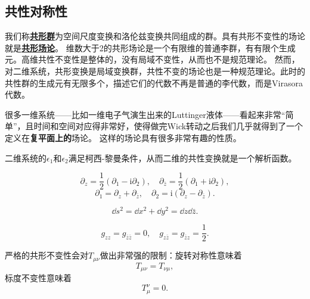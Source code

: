 \documentclass[hyperref, UTF8, a4paper]{ctexart}
\newcommand*{\ii}{\mathrm{i}}
\newcommand{\concept}[1]{\underline{\textbf{#1}}}
\renewcommand{\emph}{\textbf}
\begin{document}

\subsection{共性对称性}

我们称\concept{共形群}为空间尺度变换和洛伦兹变换共同组成的群。具有共形不变性的场论就是\concept{共形场论}。
维数大于2的共形场论是一个有限维的普通李群，有有限个生成元。高维共性不变性是整体的，没有局域不变性，从而也不是规范理论。
然而，对二维系统，共形变换是局域变换群，共性不变的场论也是一种规范理论。此时的共性群的生成元有无限多个，描述它们的代数不再是普通的李代数，而是Virasora代数。

很多一维系统——比如一维电子气演生出来的Luttinger液体——看起来非常“简单”，且时间和空间对应得非常好，使得做完Wick转动之后我们几乎就得到了一个定义在\emph{复平面上的}场论。
这样的场论具有很多非常有趣的性质。

二维系统的$\epsilon_1$和$\epsilon_2$满足柯西-黎曼条件，从而二维的共性变换就是一个解析函数。

\begin{equation}
    \partial_z = \frac{1}{2} (\partial_1 - \ii \partial_2), \quad \partial_{\bar{z}} = \frac{1}{2} (\partial_1 + \ii \partial_2),
\end{equation}
\begin{equation}
    \partial_1 = \partial_z + \partial_{\bar{z}}, \quad \partial_2 = \ii (\partial_z - \partial_{\bar{z}}).
\end{equation}

\begin{equation}
    \dd{s^2} = \dd{x^2} + \dd{y^2} = \dd{z} \dd{\bar{z}}.
\end{equation}

\begin{equation}
    g_{zz} = g_{\bar{z} \bar{z}} = 0, \quad g_{z \bar{z}} = g_{\bar{z} z} = \frac{1}{2}.
\end{equation}

严格的共形不变性会对$T_{\mu \nu}$做出非常强的限制：旋转对称性意味着
\begin{equation}
    T_{\mu \nu} = T_{\nu \mu},
\end{equation}
标度不变性意味着
\begin{equation}
    T_{\mu}^\nu = 0.
\end{equation}
\end{document}
